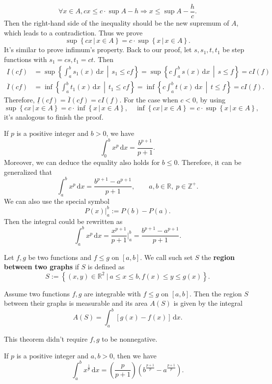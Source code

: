 \begin{proofenv}
		\[
		\forall x\in A, cx \le c\cdot \sup A-h 
		\Rightarrow x \le \sup A-\frac{h}{c}.
		\]
		Then the right-hand side of the inequality should be the new supremum of $A$, which leads to a contradiction. Thus we prove
		\[
		\sup\left\{cx\,|\,x\in A \right\} = c\cdot\sup\left\{ x\,|\,x\in A\right\}.
		\]
		It's similar to prove infimum's property. Back to our proof, let $s,s_1,t,t_1$ be step functions with $s_1=cs,t_1=ct$. Then
		\[
		\begin{aligned}
			\underline{I}(cf) &= \sup \left\{ \int_a^b s_1(x) \, \mathrm{d}x \,\middle|\, s_1 \le cf \right\}
			=\sup \left\{ c\int_a^b s(x) \, \mathrm{d}x \,\middle|\, s \le f \right\}
			=cI(f)\\[6pt]
			\overline{I}(cf) &= \inf \left\{ \int_a^b t_1(x) \, \mathrm{d}x \,\middle|\, t_1 \le cf \right\}
			=\inf \left\{ c\int_a^b t(x) \, \mathrm{d}x \,\middle|\, t \le f \right\}
			=cI(f).
		\end{aligned}
		\]
		Therefore, $\underline{I}(cf)=\overline{I}(cf)=cI(f)$. For the case when $c<0$, by using
		\[
		\sup\left\{cx\,|\,x\in A \right\} = c\cdot\inf\left\{ x\,|\,x\in A\right\},
		\quad \inf \left\{cx\,|\,x\in A \right\} = c\cdot\sup \left\{ x\,|\,x\in A\right\},
		\]
		it's analogous to finish the proof.
	\end{proofenv}
	
	\begin{theoremenv}
		If $p$ is a positive integer and $b>0$, we have
		\[
		\int_0^b x^p \, \mathrm{d}x = \frac{b^{p+1}}{p + 1}.
		\]
		Moreover, we can deduce the equality also holds for $b\le 0$. Therefore, it can be generalized that
		\[
		\int_a^b x^p \, \mathrm{d}x = \frac{b^{p+1} - a^{p+1}}{p + 1},\qquad a,b\in \mathbb{R},\ p\in \mathbb{Z}^+.
		\]
		We can also use the special symbol
		\[
		P(x)\Big|_a^b :=P(b)-P(a).
		\]
		Then the integral could be rewritten as
		\[
		\int_a^b x^p \, \mathrm{d}x
		= \frac{x^{p+1}}{p + 1} \Big|_a^b
		= \frac{b^{p+1} - a^{p+1}}{p + 1}.
		\]
	\end{theoremenv}
	\begin{definitionenv}
		Let $f,g$ be two functions and $f\le g$ on $[a,b]$. We call such set $S$ the \textbf{region between two graphs} if $S$ is defined as
		\[
		S:=\left\{(x,y)\in \mathbb{R}^2\ |\ a\le x \le b,f(x)\le y\le g(x) \right\}.
		\]
	\end{definitionenv}
	\begin{theoremenv}
		Assume two functions $f,g$ are integrable with $f\le g$ on $[a,b]$. Then the region $S$ between their graphs is measurable and its area $A(S)$ is given by the integral
		\[
		A(S)=\int_a^b [g(x)-f(x)]\,\mathrm{d}x.
		\]
	\end{theoremenv}
	\begin{remarkenv}
		This theorem didn't require $f,g$ to be nonnegative.
	\end{remarkenv}
	\begin{theoremenv}
		 If $p$ is a positive integer and $a,b>0$, then we have
		 \[
		 \int_a^b x^{\frac{1}{p}} \, \mathrm{d}x = 
		 \left(\frac{p}{p+1} \right)\left(b^{\frac{p+1}{p}}- a^{\frac{p+1}{p}}\right).
		 \]
	\end{theoremenv}
	\newpage